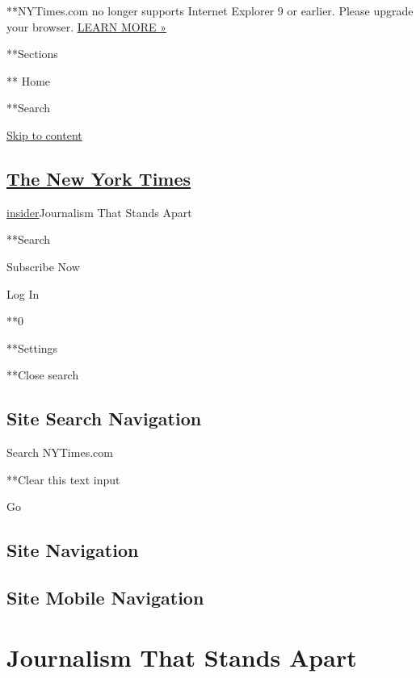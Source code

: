 **NYTimes.com no longer supports Internet Explorer 9 or earlier. Please
upgrade your browser.
\href{https://www.nytimes.com/content/help/site/ie9-support.html}{LEARN
MORE »}

**Sections

** Home

**Search

\href{https://www.nytimes.com/projects/2020-report/index.html\#main}{Skip
to content}

\hypertarget{the-new-york-times}{%
\subsection{\texorpdfstring{\href{https://www.nytimes.com/}{The New York
Times}}{The New York Times}}\label{the-new-york-times}}

\href{}{insider}\textbar{}Journalism That Stands Apart

**Search

Subscribe Now

Log In

**0

**Settings

**Close search

\hypertarget{site-search-navigation}{%
\subsection{Site Search Navigation}\label{site-search-navigation}}

Search NYTimes.com

**Clear this text input

Go

\hypertarget{site-navigation}{%
\subsection{Site Navigation}\label{site-navigation}}

\hypertarget{site-mobile-navigation}{%
\subsection{Site Mobile Navigation}\label{site-mobile-navigation}}

\hypertarget{journalism-that-stands-apart}{%
\section{Journalism That Stands
Apart}\label{journalism-that-stands-apart}}

